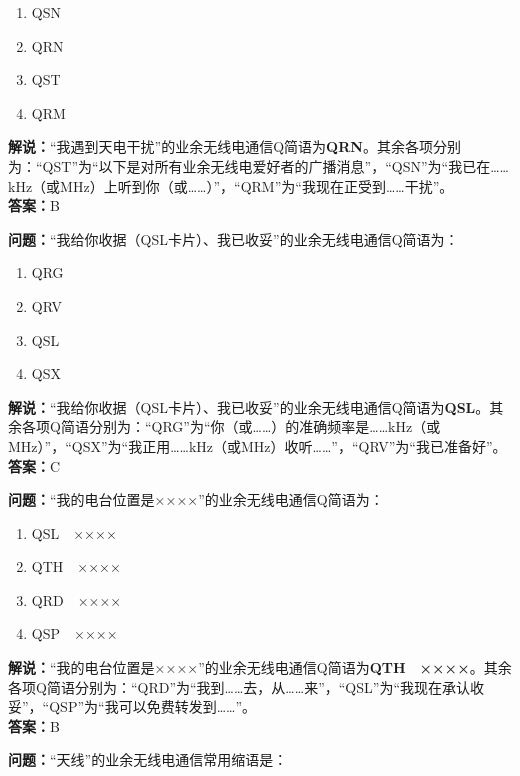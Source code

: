 \documentclass{ctexbook}
\begin{document}
\begin{enumerate}[label=\Alph*), leftmargin=3em]
	\item QSN
	\item QRN
	\item QST
	\item QRM
\end{enumerate}

\noindent\textbf{解说：}“我遇到天电干扰”的业余无线电通信Q简语为\textbf{QRN}。其余各项分别为：“QST”为“以下是对所有业余无线电爱好者的广播消息”，“QSN”为“我已在……kHz（或MHz）上听到你（或……）”，“QRM”为“我现在正受到……干扰”。\\\noindent\textbf{答案：}B


\bigskip


\noindent\textbf{问题：}“我给你收据（QSL卡片）、我已收妥”的业余无线电通信Q简语为：

\begin{enumerate}[label=\Alph*), leftmargin=3em]
	\item QRG
	\item QRV
	\item QSL
	\item QSX
\end{enumerate}

\noindent\textbf{解说：}“我给你收据（QSL卡片）、我已收妥”的业余无线电通信Q简语为\textbf{QSL}。其余各项Q简语分别为：“QRG”为“你（或……）的准确频率是……kHz（或MHz）”，“QSX”为“我正用……kHz（或MHz）收听……”，“QRV”为“我已准备好”。\\\noindent\textbf{答案：}C


\bigskip


\noindent\textbf{问题：}“我的电台位置是××××”的业余无线电通信Q简语为：

\begin{enumerate}[label=\Alph*), leftmargin=3em]
	\item QSL　××××
	\item QTH　××××
	\item QRD　××××
	\item QSP　××××
\end{enumerate}

\noindent\textbf{解说：}“我的电台位置是××××”的业余无线电通信Q简语为\textbf{QTH　××××}。其余各项Q简语分别为：“QRD”为“我到……去，从……来”，“QSL”为“我现在承认收妥”，“QSP”为“我可以免费转发到……”。\\\noindent\textbf{答案：}B


\bigskip


\noindent\textbf{问题：}“天线”的业余无线电通信常用缩语是：
\end{document}
